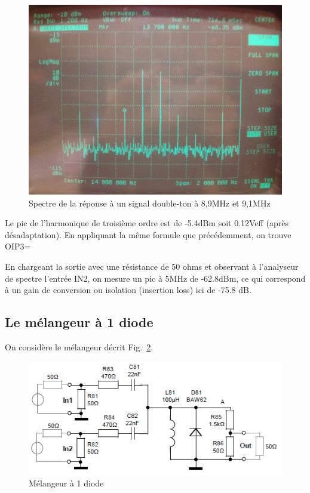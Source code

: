 \documentclass{article}
\begin{document}
\begin{figure}[h!]
	\centering
	\includegraphics[width=.7\textwidth]{10_3_4}
	\caption{Spectre de la réponse à un signal double-ton à 8,9MHz et 9,1MHz}
	\label{fig:10_3_4}
\end{figure}

Le pic de l'harmonique de troisième ordre est de -5.4dBm soit 0.12Veff (après désadaptation).
En appliquant la même formule que précédemment, on trouve OIP3=



En chargeant la sortie avec une résistance de 50 ohms et observant à l'analyseur de spectre l'entrée IN2, on mesure un pic à 5MHz de -62.8dBm, ce qui correspond à un gain de conversion ou isolation  (insertion loss) ici de -75.8 dB.


\subsection{Le mélangeur à 1 diode}

On considère le mélangeur décrit Fig.~\ref{fig:schema_melangeur_diode}.
\begin{figure}[h!]
	\centering
	\includegraphics[width=.7\textwidth]{schema_melangeur_diode}
	\caption{Mélangeur à 1 diode}
	\label{fig:schema_melangeur_diode}
\end{figure}
\end{document}
